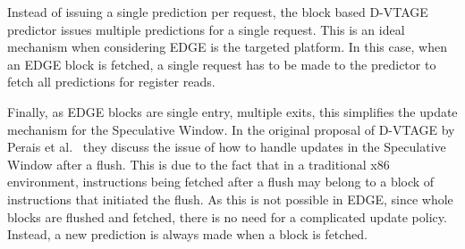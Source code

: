 Instead of issuing a single prediction per request, the block based D-VTAGE predictor issues multiple predictions for a single request.
This is an ideal mechanism when considering EDGE is the targeted platform.
In this case, when an EDGE block is fetched, a single request has to be made to the predictor to fetch all predictions for register reads.

Finally, as EDGE blocks are single entry, multiple exits, this simplifies the update mechanism for the Speculative Window.
In the original proposal of D-VTAGE by Perais et al.~\cite{peraisBeBop2015} they discuss the issue of how to handle updates in the Speculative Window after a flush.
This is due to the fact that in a traditional x86 environment, instructions being fetched after a flush may belong to a block of instructions that initiated the flush.
As this is not possible in EDGE, since whole blocks are flushed and fetched, there is no need for a complicated update policy.
Instead, a new prediction is always made when a block is fetched.





